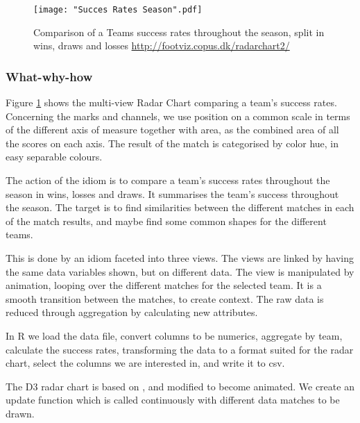 \documentclass[Report.tex]{subfiles}
\begin{document}
\begin{figure}
\center
\texttt{[image: "Succes Rates Season".pdf]}
\caption{Comparison of a Teams success rates throughout the season, split in wins, draws and losses \url{http://footviz.copus.dk/radarchart2/}}
\label{Fig:CC}
\end{figure}


\subsubsection{What-why-how}
Figure \ref{Fig:CC} shows the multi-view Radar Chart comparing a team's success rates. Concerning the marks and channels, we use position on a common scale in terms of the different axis of measure together with area, as the combined area of all the scores on each axis. The result of the match is categorised by color hue, in easy separable colours.  

The action of the idiom is to compare a team's success rates throughout the season in wins, losses and draws. It summarises the team's success throughout the season.
The target is to find similarities between the different matches in each of the match results, and maybe find some common shapes for the different teams.

This is done by an idiom faceted into three views. The views are linked by having the same data variables shown, but on different data. The view is manipulated by animation, looping over the different matches for the selected team. It is a smooth transition between the matches, to create context. The raw data is reduced through aggregation by calculating new attributes.

In R we load the data file, convert columns to be numerics, aggregate by team, calculate the success rates, transforming the data to a format suited for the radar chart, select the columns we are interested in, and write it to csv.

The D3 radar chart is based on \cite{Radar}, and modified to become animated. We create an update function which is called continuously with different data matches to be drawn. 
\end{document}
